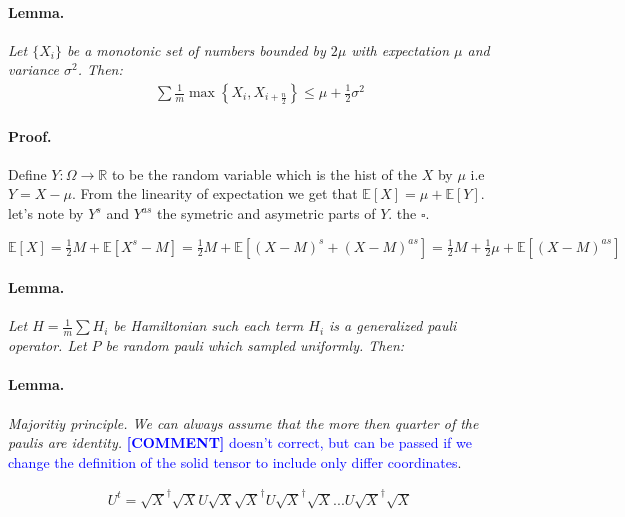 \documentclass{article}
\newcommand{\commentt}[1]{\textcolor{blue}{ \textbf{[COMMENT]} #1}}
\newcommand{\ctt}[1]{\commentt{#1}}
\begin{document}
\begin{multicols*}{2}
\paragraph{Lemma.} \textit{Let \(\{X_{i}\}\) be a monotonic set of numbers bounded by \(2\mu\) with expectation \( \mu \) and variance \( \sigma^2 \). Then:}
\begin{equation*}
    \begin{split}
        \sum{ \frac{1}{m}\max{ \left\{ X_{i}, X_{i+ \frac{n}{2}} \right\} } } \le \mu + \frac{1}{2}\sigma^2  
    \end{split}
\end{equation*}
\paragraph{Proof.} Define \(Y : \Omega \rightarrow \mathbb{R} \) to be the random  variable which is the hist of the \(X\) by \(\mu\) i.e \(Y = X -\mu\). From the linearity of expectation we get that \(\mathbb{E}[X] = \mu + \mathbb{E}[Y]\). let's note by \(Y^{s}\) and \(Y^{as}\) the symetric and asymetric parts of \(Y\). the \(\square\). 

\( \mathbb{E}[X] = \frac{1}{2}M + \mathbb{E}[X^{s} - M] = \frac{1}{2}M + \mathbb{E}[(X-M)^{s} + (X-M)^{as}] = \frac{1}{2}M + \frac{1}{2}\mu + \mathbb{E}[(X-M)^{as}] \) 

\paragraph{Lemma.} \textit{Let \( H = \frac{1}{m}\sum{H_{i}}\) be Hamiltonian such each term \(H_{i}\) is a generalized pauli operator. Let \(P\) be random pauli which sampled uniformly. Then:   }


\paragraph{Lemma.} \textit{Majoritiy principle. We can always assume that the more then quarter of the paulis are identity. } \ctt{ doesn't correct, but can be passed if we change the definition of the solid tensor to include only differ coordinates}.

\begin{equation*}
    \begin{split}
        U^{t} = \sqrt{X}^\dagger\sqrt{X}U\sqrt{X}\sqrt{X}^\dagger U \sqrt{X}^\dagger\sqrt{X} ... U \sqrt{X}^\dagger\sqrt{X}
    \end{split}
\end{equation*}


\end{multicols*}
\end{document}
